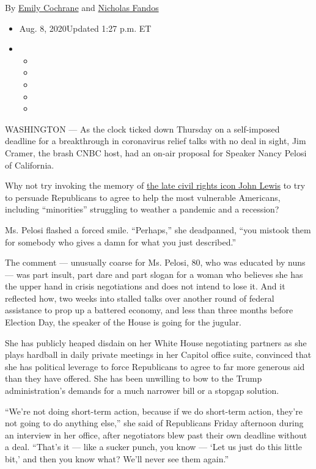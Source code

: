By \href{https://www.nytimes.com/by/emily-cochrane}{Emily Cochrane} and
\href{https://www.nytimes.com/by/nicholas-fandos}{Nicholas Fandos}

\begin{itemize}
\item
  Aug. 8, 2020Updated 1:27 p.m. ET
\item
  \begin{itemize}
  \item
  \item
  \item
  \item
  \item
  \end{itemize}
\end{itemize}

WASHINGTON --- As the clock ticked down Thursday on a self-imposed
deadline for a breakthrough in coronavirus relief talks with no deal in
sight, Jim Cramer, the brash CNBC host, had an on-air proposal for
Speaker Nancy Pelosi of California.

Why not try invoking the memory of
\href{https://www.nytimes.com/2020/07/17/us/john-lewis-dead.html}{the
late civil rights icon John Lewis} to try to persuade Republicans to
agree to help the most vulnerable Americans, including ``minorities''
struggling to weather a pandemic and a recession?

Ms. Pelosi flashed a forced smile. ``Perhaps,'' she deadpanned, ``you
mistook them for somebody who gives a damn for what you just
described.''

The comment --- unusually coarse for Ms. Pelosi, 80, who was educated by
nuns --- was part insult, part dare and part slogan for a woman who
believes she has the upper hand in crisis negotiations and does not
intend to lose it. And it reflected how, two weeks into stalled talks
over another round of federal assistance to prop up a battered economy,
and less than three months before Election Day, the speaker of the House
is going for the jugular.

She has publicly heaped disdain on her White House negotiating partners
as she plays hardball in daily private meetings in her Capitol office
suite, convinced that she has political leverage to force Republicans to
agree to far more generous aid than they have offered. She has been
unwilling to bow to the Trump administration's demands for a much
narrower bill or a stopgap solution.

``We're not doing short-term action, because if we do short-term action,
they're not going to do anything else,'' she said of Republicans Friday
afternoon during an interview in her office, after negotiators blew past
their own deadline without a deal. ``That's it --- like a sucker punch,
you know --- `Let us just do this little bit,' and then you know what?
We'll never see them again.''

